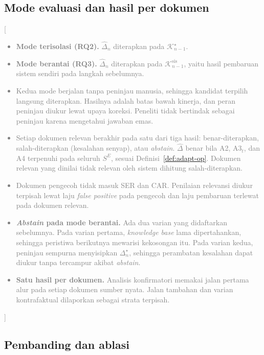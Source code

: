 \documentclass[journal,a4paper]{IEEEtran}
\newcommand{\en}[1]{\textit{#1}}
\newcommand{\K}{\mathcal{K}}
\newcommand{\emas}{\star}
\newcommand{\SE}{S^{E}}
\newif\ifrancangan \rancangantrue
\newcommand{\isian}[1]{\ifrancangan\textcolor{gray}{[#1]}\fi}
\begin{document}
\subsection{Mode evaluasi dan hasil per dokumen}
\isian{
\begin{itemize}[leftmargin=*,nosep]
  \item \textbf{Mode terisolasi (RQ2).} $\hat{\Delta}_n$ diterapkan pada $\K^{\emas}_{n-1}$.
  \item \textbf{Mode berantai (RQ3).} $\hat{\Delta}_n$ diterapkan pada $\K^{\mathrm{sis}}_{n-1}$, yaitu hasil pembaruan sistem sendiri pada langkah sebelumnya.
  \item Kedua mode berjalan tanpa peninjau manusia, sehingga kandidat terpilih langsung diterapkan. Hasilnya adalah batas bawah kinerja, dan peran peninjau diukur lewat upaya koreksi. Peneliti tidak bertindak sebagai peninjau karena mengetahui jawaban emas.
  \item Setiap dokumen relevan berakhir pada satu dari tiga hasil: benar-diterapkan, salah-diterapkan (kesalahan senyap), atau \en{abstain}. $\hat{\Delta}$ benar bila A2, A3$_t$, dan A4 terpenuhi pada seluruh $\SE$, sesuai Definisi~\ref{def:adapt-op}. Dokumen relevan yang dinilai tidak relevan oleh sistem dihitung salah-diterapkan.
  \item Dokumen pengecoh tidak masuk SER dan CAR. Penilaian relevansi diukur terpisah lewat laju \en{false positive} pada pengecoh dan laju pembaruan terlewat pada dokumen relevan.
  \item \textbf{\en{Abstain} pada mode berantai.} Ada dua varian yang didaftarkan sebelumnya. Pada varian pertama, \en{knowledge base} lama dipertahankan, sehingga peristiwa berikutnya mewarisi kekosongan itu. Pada varian kedua, peninjau sempurna menyisipkan $\Delta^{\emas}_n$, sehingga perambatan kesalahan dapat diukur tanpa tercampur akibat \en{abstain}.
  \item \textbf{Satu hasil per dokumen.} Analisis konfirmatori memakai jalan pertama alur pada setiap dokumen sumber nyata. Jalan tambahan dan varian kontrafaktual dilaporkan sebagai strata terpisah.
\end{itemize}}

\subsection{Pembanding dan ablasi}
\end{document}
